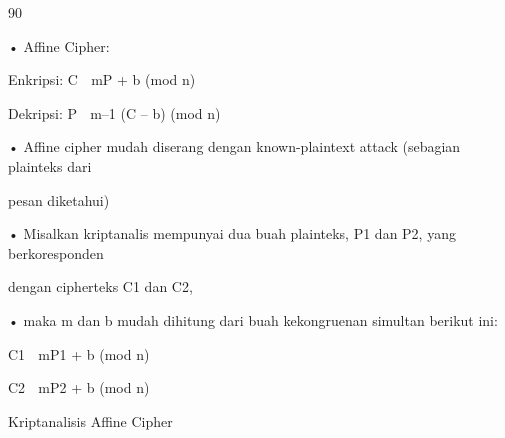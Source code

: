 \documentclass{article}
\begin{document}

90

• Affine Cipher:

             Enkripsi: C  mP + b (mod n) 


Dekripsi: P   m–1 (C – b) (mod n)

• Affine cipher mudah diserang dengan known-plaintext attack (sebagian plainteks dari 

pesan diketahui) 

• Misalkan kriptanalis mempunyai dua buah plainteks, P1 dan P2, yang berkoresponden 

dengan cipherteks C1 dan C2, 

• maka m dan b mudah dihitung dari buah kekongruenan simultan berikut ini:


C1  mP1 + b (mod n) 


C2  mP2 + b (mod n)  

Kriptanalisis Affine Cipher
\end{document}

